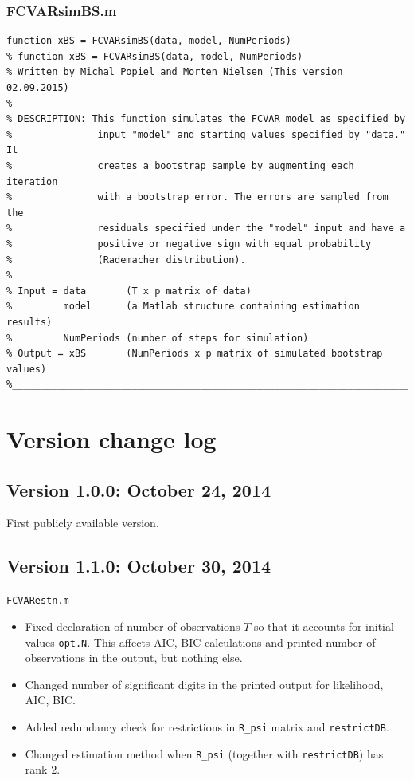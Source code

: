 \documentclass[10pt]{article}
\begin{document}
\subsubsection{FCVARsimBS.m}
\begin{lstlisting}[frame=single,caption={FCVARsimBS.m}]
function xBS = FCVARsimBS(data, model, NumPeriods)
% function xBS = FCVARsimBS(data, model, NumPeriods)
% Written by Michal Popiel and Morten Nielsen (This version 02.09.2015)
% 
% DESCRIPTION: This function simulates the FCVAR model as specified by
%               input "model" and starting values specified by "data." It
%               creates a bootstrap sample by augmenting each iteration
%               with a bootstrap error. The errors are sampled from the
%               residuals specified under the "model" input and have a
%               positive or negative sign with equal probability
%               (Rademacher distribution). 
%
% Input = data       (T x p matrix of data)
%         model      (a Matlab structure containing estimation results)
%         NumPeriods (number of steps for simulation)
% Output = xBS       (NumPeriods x p matrix of simulated bootstrap values)
%_________________________________________________________________________
\end{lstlisting}


\newpage
\appendix
\section{Version change log}
\label{sec version}

\subsection{Version 1.0.0: October 24, 2014}
\noindent First publicly available version.

\subsection{Version 1.1.0: October 30, 2014}
\noindent \verb|FCVARestn.m|
\begin{itemize}
\item Fixed declaration of number of observations $T$ so that it accounts for initial values \verb|opt.N|. This affects AIC, BIC calculations and printed number of observations in the output, but nothing else.
\item Changed number of significant digits in the printed output for likelihood, AIC, BIC.
\item Added redundancy check for restrictions in \verb|R_psi| matrix and \verb|restrictDB|.
\item Changed estimation method when \verb|R_psi| (together with \verb|restrictDB|) has rank $2$.
\end{itemize}
\end{document}
